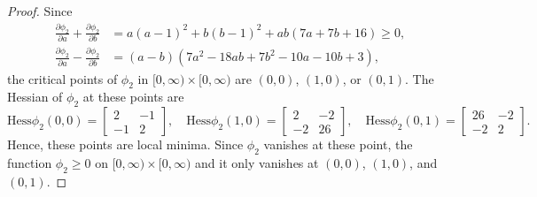 \documentclass[11pt,letterpaper]{amsart}
\theoremstyle{definition}
\numberwithin{equation}{section}
\begin{document}
\begin{proof}
Since
\begin{equation}
\begin{split}
\frac{\partial \phi_2}{\partial a}+\frac{\partial \phi_2}{\partial b}&= a(a-1)^2+b(b-1)^2 + ab(7a + 7b  + 16)\geq 0,\\
\frac{\partial \phi_2}{\partial a}-\frac{\partial \phi_2}{\partial b}&=(a-b)(7a^2 - 18ab + 7b^2 - 10a - 10b + 3),
\end{split}
\end{equation}
the critical points of $\phi_2$ in $[0,\infty)\times [0,\infty)$ are $(0,0)$, $(1,0)$, or $(0,1)$.
The Hessian of $\phi_2$ at these points are
$$
\mathrm{Hess}\phi_2(0,0)=\begin{bmatrix}
2&-1\\
-1&2
\end{bmatrix},\quad \mathrm{Hess}\phi_2(1,0)=\begin{bmatrix}
2&-2\\
-2&26
\end{bmatrix},\quad \mathrm{Hess}\phi_2(0,1)=\begin{bmatrix}
26&-2\\
-2&2
\end{bmatrix}.
$$
Hence, these points are local minima. Since $\phi_2$ vanishes at these point, the function $\phi_2\geq 0$ on $[0,\infty)\times [0,\infty)$ and it only vanishes at $(0,0)$, $(1,0)$, and $(0,1)$. 


\end{proof}
\end{document}
